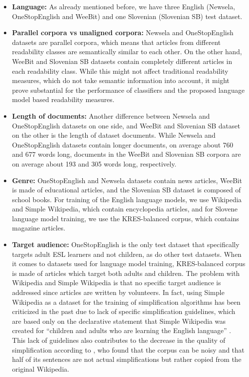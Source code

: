 \documentclass{clv3}
\begin{document}
\begin{itemize}
    \item \textbf{Language:} As already mentioned before, we have three English (Newsela, OneStopEnglish and WeeBit) and one Slovenian (Slovenian SB) test dataset.
    \item \textbf{Parallel corpora vs unaligned corpora:} Newsela and OneStopEnglish datasets are parallel corpora, which means that articles from different readability classes are semantically similar to each other. On the other hand, WeeBit and Slovenian SB datasets contain completely different articles in each readability class. While this might not affect traditional readability measures, which do not take semantic information into account, it might prove substantial for the performance of classifiers and the proposed language model based readability measures.
    \item \textbf{Length of documents:}  Another difference between Newsela and OneStopEnglish datasets on one side, and WeeBit and Slovenian SB dataset on the other is the length of dataset documents. While Newsela and OneStopEnglish datasets contain longer documents, on average about 760 and 677 words long, documents in the WeeBit and Slovenian SB corpora are on average about 193 and 305 words long, respectively.
    \item \textbf{Genre:} OneStopEnglish and Newsela datasets contain news articles, WeeBit is made of educational articles, and the Slovenian SB dataset is composed of school books. For training of the English language models, we use Wikipedia and Simple Wikipedia, which contain encyclopedia articles, and for Slovene language model training, we use the KRES-balanced corpus, which contains magazine articles. 
    \item \textbf{Target audience:}  OneStopEnglish is the only test dataset that specifically targets adult ESL learners and not children, as do other test datasets. When it comes to datasets used for language model training, KRES-balanced corpus is made of articles which target both adults and children. The problem with Wikipedia and Simple Wikipedia is that no specific target audience is addressed since articles are written by volunteers. In fact, using Simple Wikipedia as a dataset for the training of simplification algorithms has been criticized in the past due to lack of specific simplification guidelines, which are based only on the declarative statement that Simple Wikipedia was created for ``children and adults who are learning the English language'' \citep{xu2015problems}. This lack of guidelines also contributes to the decrease in the quality of simplification according to \citet{xu2015problems}, who found that the corpus can be noisy and that half of its sentences are not actual simplifications but rather copied from the original Wikipedia.    
    
\end{itemize}
\end{document}
